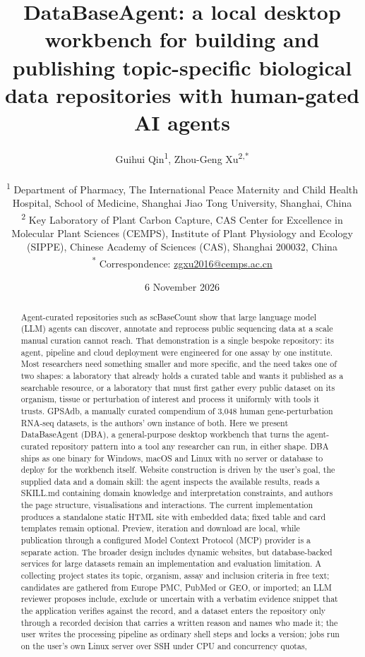 \documentclass[11pt,a4paper]{article}
\title{DataBaseAgent: a local desktop workbench for building and publishing
topic-specific biological data repositories with human-gated AI agents}
\author{Guihui Qin\textsuperscript{1}, Zhou-Geng Xu\textsuperscript{2,*}\\[6pt]
\parbox{0.92\textwidth}{\centering\small
\textsuperscript{1} Department of Pharmacy, The International Peace Maternity and Child Health Hospital, School of Medicine, Shanghai Jiao Tong University, Shanghai, China\\[4pt]
\textsuperscript{2} Key Laboratory of Plant Carbon Capture, CAS Center for Excellence in Molecular Plant Sciences (CEMPS), Institute of Plant Physiology and Ecology (SIPPE), Chinese Academy of Sciences (CAS), Shanghai 200032, China\\[4pt]
\textsuperscript{*} Correspondence: \href{mailto:zgxu2016@cemps.ac.cn}{zgxu2016@cemps.ac.cn}}}
\date{6 November 2026}
\begin{document}
\maketitle

\begin{abstract}
Agent-curated repositories such as scBaseCount show that large language
model (LLM) agents can discover, annotate and reprocess public
sequencing data at a scale manual curation cannot reach. That
demonstration is a single bespoke repository: its agent, pipeline and
cloud deployment were engineered for one assay by one institute. Most
researchers need something smaller and more specific, and the need takes
one of two shapes: a laboratory that already holds a curated table and
wants it published as a searchable resource, or a laboratory that must
first gather every public dataset on its organism, tissue or
perturbation of interest and process it uniformly with tools it trusts.
GPSAdb, a manually curated compendium of 3,048 human gene-perturbation
RNA-seq datasets, is the authors' own instance of both. Here we present
DataBaseAgent (DBA), a general-purpose desktop workbench that turns the
agent-curated repository pattern into a tool any researcher can run, in
either shape. DBA ships as one binary for Windows, macOS and Linux with
no server or database to deploy for the workbench itself. Website construction
is driven by the user's goal, the supplied data and a domain skill: the
agent inspects the available results, reads a SKILL.md containing domain
knowledge and interpretation constraints, and authors the page structure,
visualisations and interactions. The current implementation produces a
standalone static HTML site with embedded data; fixed table and card
templates remain optional. Preview, iteration and download are local,
while publication through a configured Model Context Protocol (MCP)
provider is a separate action. The broader design includes dynamic
websites, but database-backed services for large datasets remain an
implementation and evaluation limitation. A collecting project states its
topic, organism, assay and inclusion criteria in free text; candidates
are gathered from Europe PMC, PubMed or GEO, or imported; an LLM
reviewer proposes include, exclude or uncertain with a verbatim evidence
snippet that the application verifies against the record, and a dataset
enters the repository only through a recorded decision that carries a
written reason and names who made it; the user writes the processing
pipeline as ordinary shell steps and locks a version; jobs run on the
user's own Linux server over SSH under CPU and concurrency quotas,

\end{abstract}
\end{document}

